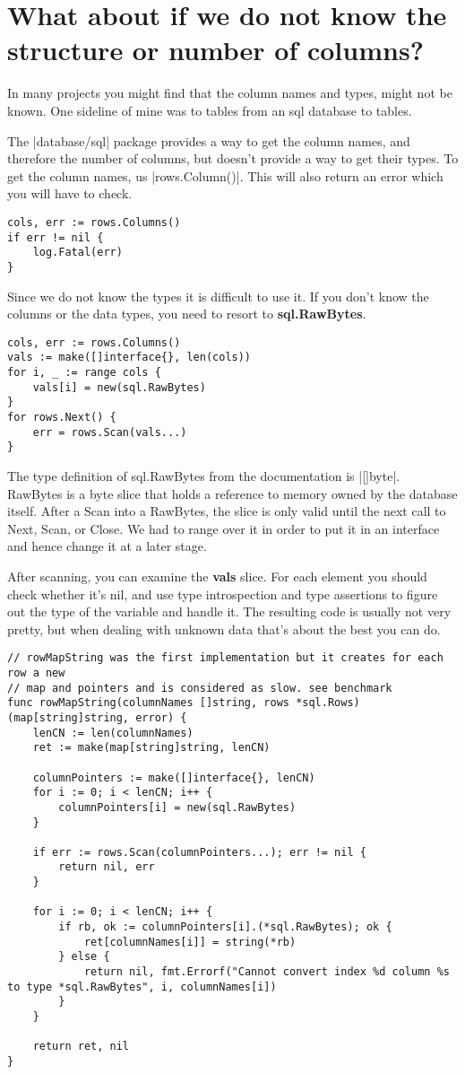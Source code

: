 \section{What about if we do not know the structure or number of columns?}

In many projects you might find that the column names and types, might not be known. One sideline of mine was to tables from an sql database to \latexe tables.

The |database/sql| package provides a way to get the column names, and therefore the number of columns, but doesn't provide a way to get their types. To get the column names, us |rows.Column()|. This will also return an error which you will have to check. 

\begin{verbatim}
cols, err := rows.Columns()
if err != nil {
	log.Fatal(err)
}
\end{verbatim}

Since we do not know the types it is difficult to use it. If you don't know the columns or the data types, you need to resort to \textbf{sql.RawBytes}.

\begin{verbatim}
cols, err := rows.Columns()
vals := make([]interface{}, len(cols))
for i, _ := range cols {
    vals[i] = new(sql.RawBytes)
}
for rows.Next() {
    err = rows.Scan(vals...)
}
\end{verbatim}

The type definition of sql.RawBytes from the documentation is |[]byte|. RawBytes is a byte slice that holds a reference to memory owned by the database itself. After a Scan into a RawBytes, the slice is only valid until the next call to Next, Scan, or Close. We had to range over it in order to put it in an interface and hence change it at a later stage.

After scanning, you can examine the \textbf{vals} slice. For each element you should check whether it’s nil, and use type introspection and type assertions to figure out the type of the variable and handle it. The resulting code is usually not very pretty, but when dealing with unknown data that’s about the best you can do.


\begin{verbatim}
// rowMapString was the first implementation but it creates for each row a new
// map and pointers and is considered as slow. see benchmark
func rowMapString(columnNames []string, rows *sql.Rows) (map[string]string, error) {
	lenCN := len(columnNames)
	ret := make(map[string]string, lenCN)

	columnPointers := make([]interface{}, lenCN)
	for i := 0; i < lenCN; i++ {
		columnPointers[i] = new(sql.RawBytes)
	}

	if err := rows.Scan(columnPointers...); err != nil {
		return nil, err
	}

	for i := 0; i < lenCN; i++ {
		if rb, ok := columnPointers[i].(*sql.RawBytes); ok {
			ret[columnNames[i]] = string(*rb)
		} else {
			return nil, fmt.Errorf("Cannot convert index %d column %s to type *sql.RawBytes", i, columnNames[i])
		}
	}

	return ret, nil
}
\end{verbatim}


